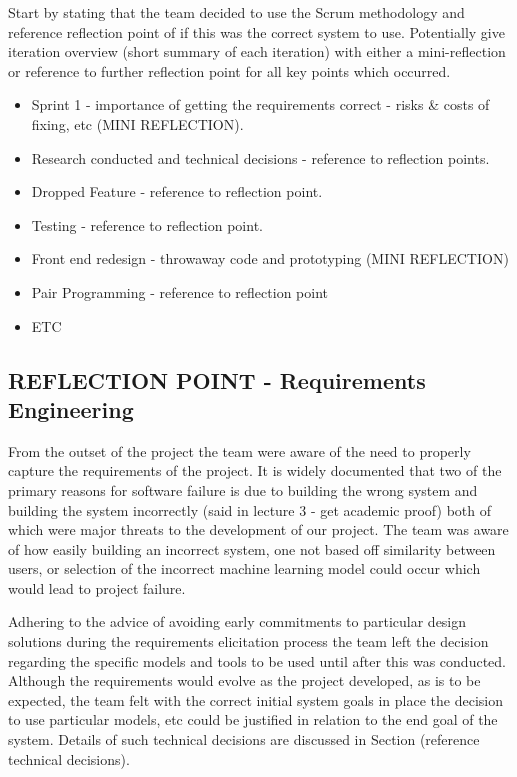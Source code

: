 \documentclass{l3proj}
\begin{document}
Start by stating that the team decided to use the Scrum methodology and reference reflection point of if this was the correct system to use. Potentially give iteration overview (short summary of each iteration) with either a mini-reflection or reference to further reflection point for all key points which occurred.
\begin{itemize}
\item Sprint 1 - importance of getting the requirements correct - risks \& costs of fixing, etc (MINI REFLECTION).
\item Research conducted and technical decisions - reference to reflection points.
\item Dropped Feature - reference to reflection point.
\item Testing - reference to reflection point.
\item Front end redesign - throwaway code and prototyping (MINI REFLECTION)
\item Pair Programming - reference to reflection point 
\item ETC
\end{itemize}


\subsection{REFLECTION POINT - Requirements Engineering}
\label{sec:teamstructure}

From the outset of the project the team were aware of the need to properly capture the requirements of the project. It is widely documented that two of the primary reasons for software failure is due to building the wrong system and building the system incorrectly (said in lecture 3 - get academic proof) both of which were major threats to the development of our project. The team was aware of how easily building an incorrect system, one not based off similarity between users, or selection of the incorrect machine learning model could occur which would lead to project failure.

Adhering to the advice of avoiding early commitments to particular design solutions during the requirements elicitation process the team left the decision regarding the specific models and tools to be used until after this was conducted. Although the requirements would evolve as the project developed, as is to be expected, the team felt with the correct initial system goals in place the decision to use particular models, etc could be justified in relation to the end goal of the system. Details of such technical decisions are discussed in Section (reference technical decisions). 
\end{document}
